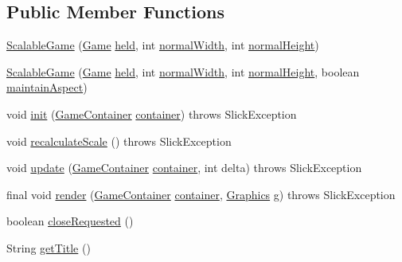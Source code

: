 \subsection*{Public Member Functions}
\begin{DoxyCompactItemize}
\item 
\mbox{\hyperlink{classorg_1_1newdawn_1_1slick_1_1_scalable_game_acb79ea3ab29ceb87713b934bf064f9ca}{Scalable\+Game}} (\mbox{\hyperlink{interfaceorg_1_1newdawn_1_1slick_1_1_game}{Game}} \mbox{\hyperlink{classorg_1_1newdawn_1_1slick_1_1_scalable_game_a9f1fb24a0827c8d6619e682e6239a475}{held}}, int \mbox{\hyperlink{classorg_1_1newdawn_1_1slick_1_1_scalable_game_a80c5555ac348d1b5224c9cf391baceae}{normal\+Width}}, int \mbox{\hyperlink{classorg_1_1newdawn_1_1slick_1_1_scalable_game_a47e0975aeb3ea50e10207311e2e9371e}{normal\+Height}})
\item 
\mbox{\hyperlink{classorg_1_1newdawn_1_1slick_1_1_scalable_game_a126e7395f32f1f274cd69bca404d2d9a}{Scalable\+Game}} (\mbox{\hyperlink{interfaceorg_1_1newdawn_1_1slick_1_1_game}{Game}} \mbox{\hyperlink{classorg_1_1newdawn_1_1slick_1_1_scalable_game_a9f1fb24a0827c8d6619e682e6239a475}{held}}, int \mbox{\hyperlink{classorg_1_1newdawn_1_1slick_1_1_scalable_game_a80c5555ac348d1b5224c9cf391baceae}{normal\+Width}}, int \mbox{\hyperlink{classorg_1_1newdawn_1_1slick_1_1_scalable_game_a47e0975aeb3ea50e10207311e2e9371e}{normal\+Height}}, boolean \mbox{\hyperlink{classorg_1_1newdawn_1_1slick_1_1_scalable_game_aad26ba584204317d6d2bca9bbb5eb716}{maintain\+Aspect}})
\item 
void \mbox{\hyperlink{classorg_1_1newdawn_1_1slick_1_1_scalable_game_ab5d4b65ac299538c5e101911fbcd7276}{init}} (\mbox{\hyperlink{classorg_1_1newdawn_1_1slick_1_1_game_container}{Game\+Container}} \mbox{\hyperlink{classorg_1_1newdawn_1_1slick_1_1_scalable_game_ae8df04372ae01e645445bc4a22f58c7c}{container}})  throws Slick\+Exception 
\item 
void \mbox{\hyperlink{classorg_1_1newdawn_1_1slick_1_1_scalable_game_abb55f95f659cbab0f9ac35b73ff16187}{recalculate\+Scale}} ()  throws Slick\+Exception 
\item 
void \mbox{\hyperlink{classorg_1_1newdawn_1_1slick_1_1_scalable_game_a400717d797b2f4529b3904e767425524}{update}} (\mbox{\hyperlink{classorg_1_1newdawn_1_1slick_1_1_game_container}{Game\+Container}} \mbox{\hyperlink{classorg_1_1newdawn_1_1slick_1_1_scalable_game_ae8df04372ae01e645445bc4a22f58c7c}{container}}, int delta)  throws Slick\+Exception 
\item 
final void \mbox{\hyperlink{classorg_1_1newdawn_1_1slick_1_1_scalable_game_a66110f8ce46498916ec06f345cad5b5c}{render}} (\mbox{\hyperlink{classorg_1_1newdawn_1_1slick_1_1_game_container}{Game\+Container}} \mbox{\hyperlink{classorg_1_1newdawn_1_1slick_1_1_scalable_game_ae8df04372ae01e645445bc4a22f58c7c}{container}}, \mbox{\hyperlink{classorg_1_1newdawn_1_1slick_1_1_graphics}{Graphics}} g)  throws Slick\+Exception 
\item 
boolean \mbox{\hyperlink{classorg_1_1newdawn_1_1slick_1_1_scalable_game_ad9a8b81977a256601f21e9574bb1d386}{close\+Requested}} ()
\item 
String \mbox{\hyperlink{classorg_1_1newdawn_1_1slick_1_1_scalable_game_a34d2611a0e2650677e76e8f7df5d3c6a}{get\+Title}} ()
\end{DoxyCompactItemize}

